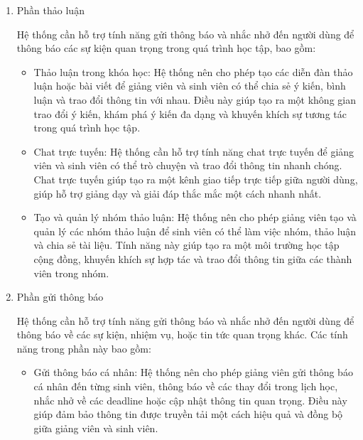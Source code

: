 \documentclass[../Thesis.tex]{subfiles}
\begin{document}
            \begin{enumerate}
                \item {Phần thảo luận}
                
                    Hệ thống cần hỗ trợ tính năng gửi thông báo và nhắc nhở đến người dùng để thông báo các sự kiện quan trọng trong quá trình học tập, bao gồm:
                    \begin{itemize}[label=$\bullet$]
                        \item Thảo luận trong khóa học: Hệ thống nên cho phép tạo các diễn đàn thảo luận hoặc bài viết để giảng viên và sinh viên có thể chia sẻ ý kiến, bình luận và trao đổi thông tin với nhau. Điều này giúp tạo ra một không gian trao đổi ý kiến, khám phá ý kiến đa dạng và khuyến khích sự tương tác trong quá trình học tập.

                        \item Chat trực tuyến: Hệ thống cần hỗ trợ tính năng chat trực tuyến để giảng viên và sinh viên có thể trò chuyện và trao đổi thông tin nhanh chóng. Chat trực tuyến giúp tạo ra một kênh giao tiếp trực tiếp giữa người dùng, giúp hỗ trợ giảng dạy và giải đáp thắc mắc một cách nhanh nhất.

                        \item Tạo và quản lý nhóm thảo luận: Hệ thống nên cho phép giảng viên tạo và quản lý các nhóm thảo luận để sinh viên có thể làm việc nhóm, thảo luận và chia sẻ tài liệu. Tính năng này giúp tạo ra một môi trường học tập cộng đồng, khuyến khích sự hợp tác và trao đổi thông tin giữa các thành viên trong nhóm.

                    \end{itemize}

                \item {Phần gửi thông báo}
                
                    Hệ thống cần hỗ trợ tính năng gửi thông báo và nhắc nhở đến người dùng để thông báo về các sự kiện, nhiệm vụ, hoặc tin tức quan trọng khác. Các tính năng trong phần này bao gồm:
                    \begin{itemize}[label=$\bullet$]
                    
                        \item Gửi thông báo cá nhân: Hệ thống nên cho phép giảng viên gửi thông báo cá nhân đến từng sinh viên, thông báo về các thay đổi trong lịch học, nhắc nhở về các deadline hoặc cập nhật thông tin quan trọng. Điều này giúp đảm bảo thông tin được truyền tải một cách hiệu quả và đồng bộ giữa giảng viên và sinh viên.
                        

\end{itemize}
\end{enumerate}
\end{document}
